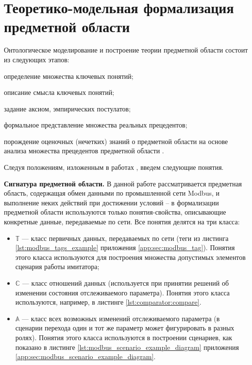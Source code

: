 


\section{Теоретико-модельная формализация предметной области}\label{sec:ontology}

Онтологическое моделирование и построение теории предметной области состоит из следующих этапов:
\begin{enumerate*}[label=\arabic*\upshape)]
    \item определение множества ключевых понятий;
    \item описание смысла ключевых понятий;
    \item задание аксиом, эмпирических постулатов;
    \item формальное представление множества реальных прецедентов;
    \item порождение оценочных (нечетких) знаний о предметной области на основе анализа множества прецедентов предметной области
        \cite{journal:philosopy_nauki:palchunov}.
\end{enumerate*}

Следуя положениям, изложенным в работах \cite{journal:vestnic_novosib:palchunov, journal:naukovedenie:serdukov},
введем следующие понятия.

\textbf{Сигнатура предметной области.}
В данной работе рассматривается предметная область, содержащая обмен данными по промышленной сети Modbus,
и выполнение неких действий при достижении условий -- в формализации предметной области используются только понятия-свойства,
описывающие конкретные данные, передаваемые по сети. Все понятия делятся на три класса:

\begin{itemize}
    \item $\mathbb{T}$ --- класс первичных данных, передаваемых по сети (теги из листинга \ref{lst:modbus_tags_example} приложения \ref{app:sec:modbus_tag}).
        Понятия этого класса используются для построения множества допустимых элементов сценария работы имитатора;
    \item $\mathbb{C}$ --- класс отношений данных (используется при принятии решений об изменении состояния отслеживаемого параметра).
        Понятия этого класса используются, например, в листинге \ref{lst:comparator:compare}.
    \item $\mathbb{A}$ --- класс всех возможных изменений отслеживаемого параметра (в сценарии перехода один и тот же параметр может фигурировать в разных ролях).
        Понятия этого класса используются в построении сценариев, как показано в листинге \ref{lst:modbus_scenario_example_diagram} приложения \ref{app:sec:modbus_scenario_example_diagram}.
\end{itemize}

